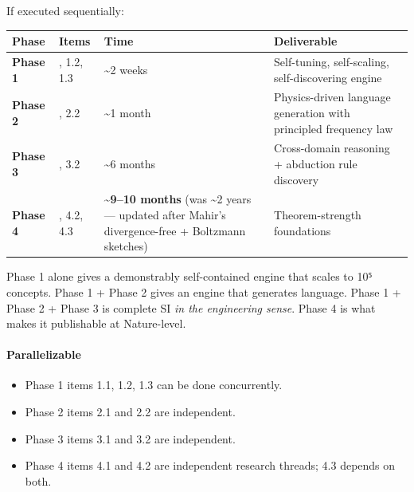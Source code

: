 \documentclass[
  11pt,
  a4paper,
]{article}
\providecommand{\tightlist}{%
  \setlength{\itemsep}{0pt}\setlength{\parskip}{0pt}}
\begin{document}
If executed sequentially:

\begin{longtable}[]{@{}
  >{\raggedright\arraybackslash}p{}
  >{\raggedright\arraybackslash}p{}
  >{\raggedright\arraybackslash}p{}
  >{\raggedright\arraybackslash}p{}@{}}
\toprule\noalign{}
\begin{minipage}[b]{\linewidth}\raggedright
Phase
\end{minipage} & \begin{minipage}[b]{\linewidth}\raggedright
Items
\end{minipage} & \begin{minipage}[b]{\linewidth}\raggedright
Time
\end{minipage} & \begin{minipage}[b]{\linewidth}\raggedright
Deliverable
\end{minipage} \\
\midrule\noalign{}
\endhead
\bottomrule\noalign{}
\endlastfoot
\textbf{Phase 1} & 1.1, 1.2, 1.3 & \textasciitilde2 weeks & Self-tuning,
self-scaling, self-discovering engine \\
\textbf{Phase 2} & 2.1, 2.2 & \textasciitilde1 month & Physics-driven
language generation with principled frequency law \\
\textbf{Phase 3} & 3.1, 3.2 & \textasciitilde6 months & Cross-domain
reasoning + abduction rule discovery \\
\textbf{Phase 4} & 4.1, 4.2, 4.3 & \textbf{\textasciitilde9--10 months}
(was \textasciitilde2 years --- updated after Mahir's divergence-free +
Boltzmann sketches) & Theorem-strength foundations \\
\end{longtable}

Phase 1 alone gives a demonstrably self-contained engine that scales to
10⁵ concepts. Phase 1 + Phase 2 gives an engine that generates language.
Phase 1 + Phase 2 + Phase 3 is complete SI \emph{in the engineering
sense}. Phase 4 is what makes it publishable at Nature-level.

\paragraph{Parallelizable}\label{parallelizable}

\begin{itemize}
\tightlist
\item
  Phase 1 items 1.1, 1.2, 1.3 can be done concurrently.
\item
  Phase 2 items 2.1 and 2.2 are independent.
\item
  Phase 3 items 3.1 and 3.2 are independent.
\item
  Phase 4 items 4.1 and 4.2 are independent research threads; 4.3
  depends on both.
\end{itemize}
\end{document}

